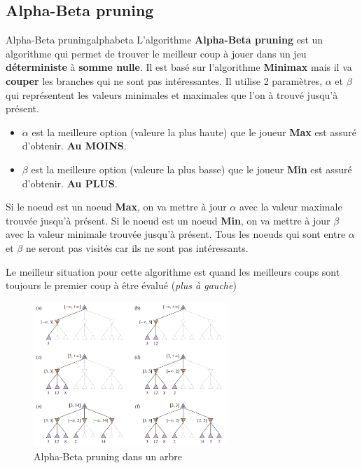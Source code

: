 \subsection{Alpha-Beta pruning} %
\label{sub:alpha_beta_pruning}

\begin{definition}{Alpha-Beta pruning}{alphabeta}
    L'algorithme \textbf{Alpha-Beta pruning} est un algorithme qui permet de trouver le meilleur coup à jouer dans un jeu \textbf{déterministe} à \textbf{somme nulle}.
    Il est basé sur l'algorithme \textbf{Minimax} mais il va \textbf{couper} les branches qui ne sont pas intéressantes.
    Il utilise 2 paramètres, $\alpha$ et $\beta$ qui représentent les valeurs minimales et maximales que l'on à trouvé jusqu'à présent.
    \begin{itemize}
        \item $\alpha$ est la meilleure option (valeure la plus haute) que le joueur \textbf{Max} est assuré d'obtenir. 
            \textbf{Au MOINS}.
        \item $\beta$ est la meilleure option (valeure la plus basse) que le joueur \textbf{Min} est assuré d'obtenir. 
            \textbf{Au PLUS}.
    \end{itemize} 
\end{definition}

Si le noeud est un noeud \textbf{Max}, on va mettre à jour $\alpha$ avec la valeur maximale trouvée jusqu'à présent. 
Si le noeud est un noeud \textbf{Min}, on va mettre à jour $\beta$ avec la valeur minimale trouvée jusqu'à présent. 
Tous les noeuds qui sont entre $\alpha$ et $\beta$ ne seront pas visités car ils ne sont pas intéressants.

\begin{remark}\leavevmode
    Le meilleur situation pour cette algorithme est quand les meilleurs coups sont toujours le 
    premier coup à être évalué (\textit{plus à gauche})
\end{remark}

\begin{figure}[H]
    \begin{center}
        \includegraphics[width=0.65\textwidth]{./pictures/alphabeta.png}
    \end{center}
    \caption{Alpha-Beta pruning dans un arbre}\label{fig:alphabeta} 
\end{figure}

